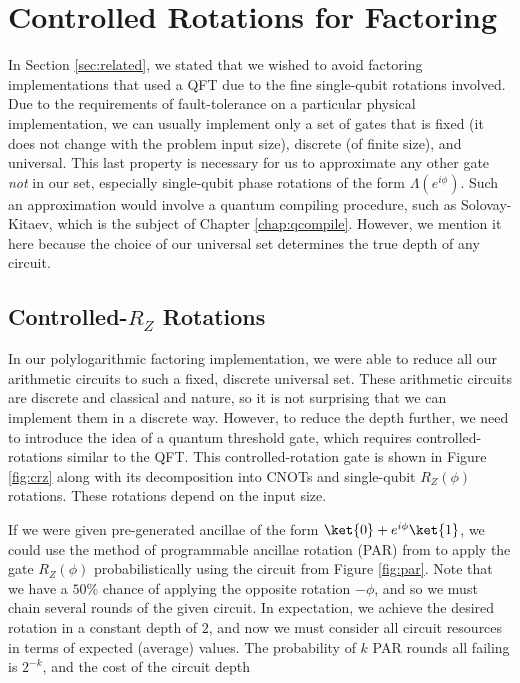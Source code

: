 \section{Controlled Rotations for Factoring}
\label{sec:factor-crz}

In Section \ref{sec:related}, we stated that we wished to avoid
factoring implementations that used a QFT due to the fine
single-qubit rotations involved. Due to the requirements of
fault-tolerance on a particular physical implementation,
we can usually implement only a set of gates that is fixed
(it does not change with the problem input size), discrete (of finite size),
and universal. This last property is necessary for us to approximate any
other gate \emph{not} in our set, especially single-qubit phase rotations
of the form $\Lambda(e^{i \phi})$. Such an approximation would involve
a quantum compiling procedure, such as Solovay-Kitaev, which is the
subject of Chapter \ref{chap:qcompile}. However, we mention it here
because the choice of our universal set determines the true depth
of any circuit.

\subsection{Controlled-$R_Z$ Rotations}

In our polylogarithmic factoring implementation, we were able to reduce
all our arithmetic circuits to such a fixed, discrete universal set.
These arithmetic circuits are discrete and classical and nature, so it is
not surprising that we can implement them in a discrete way.
However, to reduce the depth further, we need to introduce the idea of
a quantum threshold gate, which requires controlled-rotations similar to
the QFT. This controlled-rotation gate is shown in Figure \ref{fig:crz}
along with its decomposition into CNOTs and single-qubit $R_Z(\phi)$
rotations.
These rotations depend on the input size.

If we were given pre-generated ancillae of the form
$\ket{0} + e^{i\phi}\ket{1}$, we could use the method of programmable ancillae rotation (PAR) from
\cite{Jones2012}
to apply the gate $R_Z(\phi)$ probabilistically
using the circuit from Figure \ref{fig:par}. Note that we have a $50\%$
chance
of applying the opposite rotation $-\phi$, and so we must chain
several rounds of the given circuit. In expectation, we achieve the
desired rotation in a constant depth of $2$, and now we must consider
all circuit resources in terms of expected (average) values. The 
probability of $k$ PAR rounds all failing is $2^{-k}$, and the cost
of the circuit depth 

